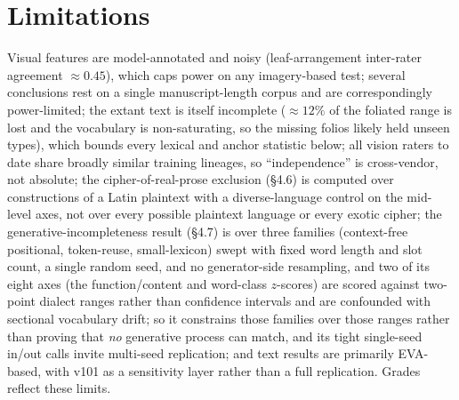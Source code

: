 \documentclass[11pt]{article}
\begin{document}
\section{Limitations}
Visual features are model-annotated and noisy (leaf-arrangement inter-rater agreement
$\approx 0.45$), which caps power on any imagery-based test; several conclusions rest
on a single manuscript-length corpus and are correspondingly power-limited; the extant
text is itself incomplete ($\approx\!12\%$ of the foliated range is lost and the
vocabulary is non-saturating, so the missing folios likely held unseen types), which
bounds every lexical and anchor statistic below; all vision raters to date share
broadly similar training lineages, so ``independence'' is cross-vendor, not absolute;
the cipher-of-real-prose exclusion (\S4.6) is computed over constructions of a Latin
plaintext with a diverse-language control on the mid-level axes, not over every possible
plaintext language or every exotic cipher; the generative-incompleteness result (\S4.7) is
over three families (context-free positional, token-reuse, small-lexicon) swept with
fixed word length and slot count, a single random seed, and no generator-side resampling,
and two of its eight axes (the function/content and word-class $z$-scores) are scored
against two-point dialect ranges rather than confidence intervals and are confounded with
sectional vocabulary drift; so it constrains those families over those ranges rather than
proving that \emph{no} generative process can match, and its tight single-seed in/out
calls invite multi-seed replication; and text results are primarily EVA-based,
with v101 as a sensitivity layer rather than a full replication. Grades reflect these
limits.
\end{document}
